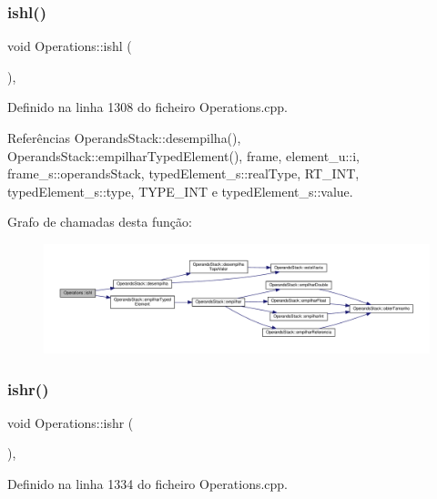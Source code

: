 \subsubsection{\texorpdfstring{ishl()}{ishl()}}
{\footnotesize\ttfamily void Operations\+::ishl (\begin{DoxyParamCaption}{ }\end{DoxyParamCaption})\hspace{0.3cm}{\ttfamily [static]}, {\ttfamily [private]}}



Definido na linha 1308 do ficheiro Operations.\+cpp.



Referências Operands\+Stack\+::desempilha(), Operands\+Stack\+::empilhar\+Typed\+Element(), frame, element\+\_\+u\+::i, frame\+\_\+s\+::operands\+Stack, typed\+Element\+\_\+s\+::real\+Type, R\+T\+\_\+\+I\+NT, typed\+Element\+\_\+s\+::type, T\+Y\+P\+E\+\_\+\+I\+NT e typed\+Element\+\_\+s\+::value.

Grafo de chamadas desta função\+:\nopagebreak
\begin{figure}[H]
\begin{center}
\leavevmode
\includegraphics[width=350pt]{classOperations_a3139bbe41519fb4761ecd7e2a8ddb994_cgraph}
\end{center}
\end{figure}
\mbox{\label{classOperations_aa67d92582121939b307658d417b34d3c}} 
\subsubsection{\texorpdfstring{ishr()}{ishr()}}
{\footnotesize\ttfamily void Operations\+::ishr (\begin{DoxyParamCaption}{ }\end{DoxyParamCaption})\hspace{0.3cm}{\ttfamily [static]}, {\ttfamily [private]}}



Definido na linha 1334 do ficheiro Operations.\+cpp.




